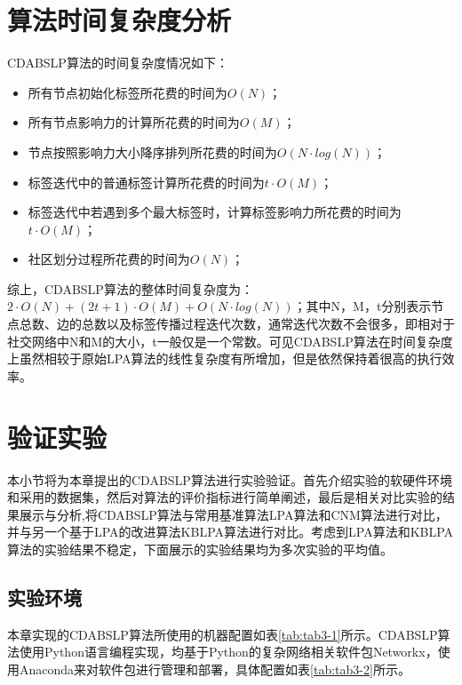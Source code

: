 \section{算法时间复杂度分析}

CDABSLP算法的时间复杂度情况如下：

\begin{itemize}
  \item 所有节点初始化标签所花费的时间为$O(N)$；
  \item 所有节点影响力的计算所花费的时间为$O(M)$；
  \item 节点按照影响力大小降序排列所花费的时间为$O(N \cdot log(N))$；
  \item 标签迭代中的普通标签计算所花费的时间为$t \cdot O(M)$；
  \item 标签迭代中若遇到多个最大标签时，计算标签影响力所花费的时间为$t \cdot O(M)$；
  \item 社区划分过程所花费的时间为$O(N)$；
\end{itemize}

综上，CDABSLP算法的整体时间复杂度为：$2 \cdot O(N)+(2t+1) \cdot O(M)+O(N \cdot log(N))$；其中N，M，t分别表示节点总数、边的总数以及标签传播过程迭代次数，通常迭代次数不会很多，即相对于社交网络中N和M的大小，t一般仅是一个常数。可见CDABSLP算法在时间复杂度上虽然相较于原始LPA算法的线性复杂度有所增加，但是依然保持着很高的执行效率。

\section{验证实验}

本小节将为本章提出的CDABSLP算法进行实验验证。首先介绍实验的软硬件环境和采用的数据集，然后对算法的评价指标进行简单阐述，最后是相关对比实验的结果展示与分析,将CDABSLP算法与常用基准算法LPA算法和CNM算法\cite{Clauset2004Finding}进行对比，并与另一个基于LPA的改进算法KBLPA算法\cite{邓观明2016基于混合的}进行对比。考虑到LPA算法和KBLPA算法的实验结果不稳定，下面展示的实验结果均为多次实验的平均值。

\subsection{实验环境}

本章实现的CDABSLP算法所使用的机器配置如表\ref{tab:tab3-1}所示。CDABSLP算法使用Python语言编程实现，均基于Python的复杂网络相关软件包Networkx，使用Anaconda来对软件包进行管理和部署，具体配置如表\ref{tab:tab3-2}所示。

